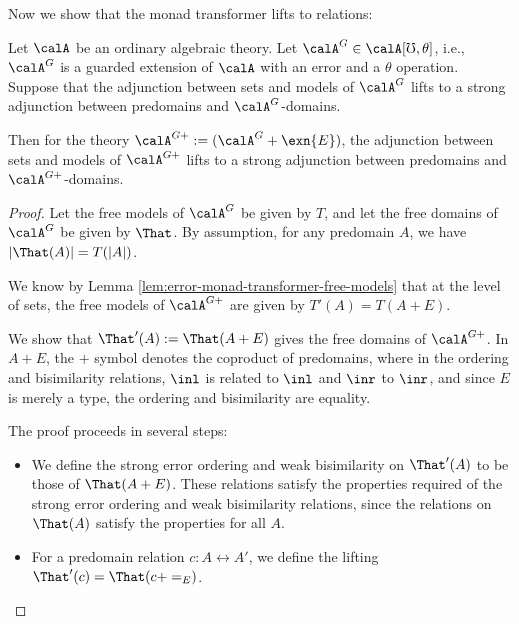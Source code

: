 Now we show that the monad transformer lifts to relations:
%
\begin{lemma}\label{lem:error-monad-transformer-free-domains}
    Let $\calA$ be an ordinary algebraic theory. Let $\calA^G \in \calA[\mho,
    \theta]$, i.e., $\calA^G$ is a guarded extension of $\calA$ with an error
    and a $\theta$ operation. Suppose that the adjunction between sets and
    models of $\calA^G$ lifts to a strong adjunction between predomains and
    $\calA^G$-domains.
    
    Then for the theory $\calA^{G+} := (\calA^{G} + \exn{E})$, the adjunction
    between sets and models of $\calA^{G+}$ lifts to a strong adjunction between
    predomains and $\calA^{G+}$-domains.
\end{lemma}
\begin{proof}
    Let the free models of $\calA^G$ be given by $T$, and let the free domains
    of $\calA^G$ be given by $\That$. By assumption, for any predomain $A$, we
    have $|\That(A)| = T(|A|)$.
    
    We know by Lemma \ref{lem:error-monad-transformer-free-models} that at the
    level of sets, the free models of $\calA^{G+}$ are given by $T'(A) = T(A +
    E)$.
    
    We show that $\That'(A) := \That(A + E)$ gives the free domains of
    $\calA^{G+}$. In $A + E$, the $+$ symbol denotes the coproduct of
    predomains, where in the ordering and bisimilarity relations, $\inl$ is
    related to $\inl$ and $\inr$ to $\inr$, and since $E$ is merely a type, the
    ordering and bisimilarity are equality.

    The proof proceeds in several steps:
    \begin{itemize}
        \item We define the strong error ordering and weak bisimilarity on
        $\That'(A)$ to be those of $\That(A + E)$. These relations satisfy the
        properties required of the strong error ordering and weak bisimilarity
        relations, since the relations on $\That(A)$ satisfy the properties for
        all $A$.

        \item For a predomain relation $c : A \rel A'$, we define the lifting
        $\That'(c) = \That(c + =_E)$.


\end{itemize}
\end{proof}
